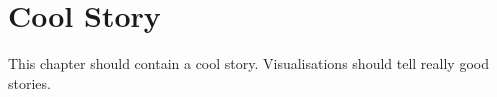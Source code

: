 \section{Cool Story}
This chapter should contain a cool story. Visualisations should tell really good stories.